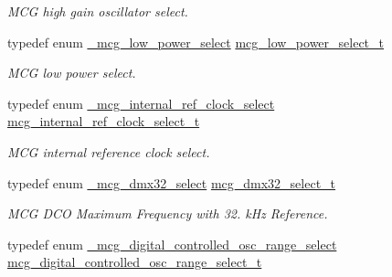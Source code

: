 \begin{DoxyCompactItemize}
\begin{DoxyCompactList}\small\item\em M\+CG high gain oscillator select. \end{DoxyCompactList}\item 
typedef enum \hyperlink{group__mcg__hal_ga84d34e14fddefaba4e6c436b47694094}{\+\_\+mcg\+\_\+low\+\_\+power\+\_\+select} \hyperlink{group__mcg__hal_gaa1874b15c44a78b3d1779a89e7aa368f}{mcg\+\_\+low\+\_\+power\+\_\+select\+\_\+t}\hypertarget{group__mcg__hal_gaa1874b15c44a78b3d1779a89e7aa368f}{}\label{group__mcg__hal_gaa1874b15c44a78b3d1779a89e7aa368f}

\begin{DoxyCompactList}\small\item\em M\+CG low power select. \end{DoxyCompactList}\item 
typedef enum \hyperlink{group__mcg__hal_ga21cfeb79f5fbb5bd48e4f66d5844e5a3}{\+\_\+mcg\+\_\+internal\+\_\+ref\+\_\+clock\+\_\+select} \hyperlink{group__mcg__hal_ga9738d5cb312dacd7c75d2ed599ad48c7}{mcg\+\_\+internal\+\_\+ref\+\_\+clock\+\_\+select\+\_\+t}\hypertarget{group__mcg__hal_ga9738d5cb312dacd7c75d2ed599ad48c7}{}\label{group__mcg__hal_ga9738d5cb312dacd7c75d2ed599ad48c7}

\begin{DoxyCompactList}\small\item\em M\+CG internal reference clock select. \end{DoxyCompactList}\item 
typedef enum \hyperlink{group__mcg__hal_ga2dc2623d99d177b249a01939ca247bb0}{\+\_\+mcg\+\_\+dmx32\+\_\+select} \hyperlink{group__mcg__hal_ga911f4fa9231b04397b0c398f7fdd1d39}{mcg\+\_\+dmx32\+\_\+select\+\_\+t}\hypertarget{group__mcg__hal_ga911f4fa9231b04397b0c398f7fdd1d39}{}\label{group__mcg__hal_ga911f4fa9231b04397b0c398f7fdd1d39}

\begin{DoxyCompactList}\small\item\em M\+CG D\+CO Maximum Frequency with 32. k\+Hz Reference. \end{DoxyCompactList}\item 
typedef enum \hyperlink{group__mcg__hal_ga544033cb68fa530bfdb008c4ba7f7e79}{\+\_\+mcg\+\_\+digital\+\_\+controlled\+\_\+osc\+\_\+range\+\_\+select} \hyperlink{group__mcg__hal_ga81370ff023d6017602054fdfef23a3cf}{mcg\+\_\+digital\+\_\+controlled\+\_\+osc\+\_\+range\+\_\+select\+\_\+t}\hypertarget{group__mcg__hal_ga81370ff023d6017602054fdfef23a3cf}{}\label{group__mcg__hal_ga81370ff023d6017602054fdfef23a3cf}


\end{DoxyCompactItemize}
